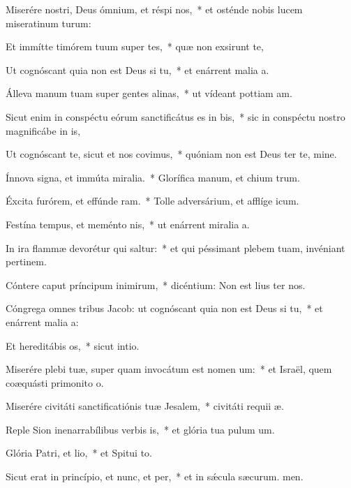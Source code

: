 \item Miserére nostri, Deus ómnium, et réspi nos,~* et osténde nobis lucem miseratinum turum:
\item Et immítte timórem tuum super tes,~* quæ non exsirunt te,
\item Ut cognóscant quia non est Deus si tu,~* et enárrent malia a.
\item Álleva manum tuam super gentes alinas,~* ut vídeant pottiam am.
\item Sicut enim in conspéctu eórum sanctificátus es in bis,~* sic in conspéctu nostro magnificábe in is,
\item Ut cognóscant te, sicut et nos covimus,~* quóniam non est Deus ter te, mine.
\item Ínnova signa, et immúta miralia.~* Glorífica manum, et chium trum.
\item Éxcita furórem, et effúnde ram.~* Tolle adversárium, et afflíge icum.
\item Festína tempus, et meménto nis,~* ut enárrent miralia a.
\item In ira flammæ devorétur qui saltur:~* et qui péssimant plebem tuam, invéniant pertinem.
\item Cóntere caput príncipum inimirum,~* dicéntium: Non est lius ter nos.
\item Cóngrega omnes tribus Jacob: ut cognóscant quia non est Deus si tu,~* et enárrent malia a:
\item Et hereditábis os,~* sicut  intio.
\item Miserére plebi tuæ, super quam invocátum est nomen um:~* et Israël, quem coæquásti primonito o.
\item Miserére civitáti sanctificatiónis tuæ Jesalem,~* civitáti requii æ.
\item Reple Sion inenarrabílibus verbis is,~* et glória tua pulum um.
\item Glória Patri, et lio,~* et Spitui to.
\item Sicut erat in princípio, et nunc, et per,~* et in sǽcula sæcurum. men.
